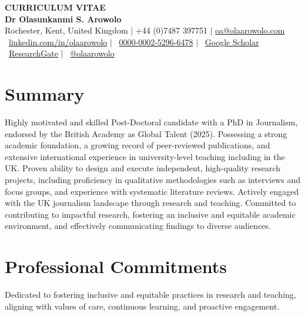 \documentclass[a4paper,11pt]{article}
\begin{document}
\begin{center}
    \textbf{\Huge \scshape CURRICULUM VITAE} \\
    \vspace{5pt}
    \textbf{\Large Dr Olasunkanmi S. Arowolo} \\ \vspace{1pt}
    \small Rochester, Kent, United Kingdom $|$ +44 (0)7487 397751 $|$ \href{mailto:oa@olaarowolo.com}{{oa@olaarowolo.com}} \\
    \vspace{3pt}
    \small \faLinkedin\ \href{https://www.linkedin.com/in/olaarowolo/}{linkedin.com/in/olaarowolo} $|$ 
    \faOrcid\ \href{https://orcid.org/0000-0002-5296-6478}{0000-0002-5296-6478} $|$ 
    \faGoogleScholar\ \href{https://scholar.google.com/citations?user=3N_RQWoAAAAJ&hl=en}{Google Scholar} \\
    \vspace{2pt}
    \small \faResearchgate\ \href{https://www.researchgate.net/profile/Sunday-Arowolo}{ResearchGate} $|$ 
    \faTwitter\ \href{https://twitter.com/olaarowolo}{@olaarowolo}
\end{center}

\raggedright


\section{Summary}
\small{Highly motivated and skilled Post-Doctoral candidate with a PhD in Journalism, endorsed by the British Academy as Global Talent (2025). Possessing a strong academic foundation, a growing record of peer-reviewed publications, and extensive international experience in university-level teaching including in the UK. Proven ability to design and execute independent, high-quality research projects, including proficiency in qualitative methodologies such as interviews and focus groups, and experience with systematic literature reviews. Actively engaged with the UK journalism landscape through research and teaching. Committed to contributing to impactful research, fostering an inclusive and equitable academic environment, and effectively communicating findings to diverse audiences.}

\section{Professional Commitments}
\small{Dedicated to fostering inclusive and equitable practices in research and teaching, aligning with values of care, continuous learning, and proactive engagement.}
\end{document}
